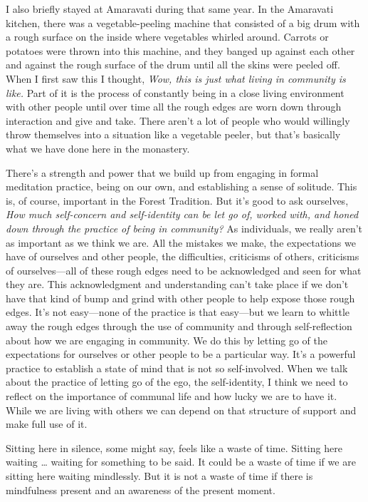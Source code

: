 I also briefly stayed at Amaravati during that same year. In the 
Amaravati kitchen, there was a vegetable-peeling machine that consisted 
of a big drum with a rough surface on the inside where vegetables 
whirled around. Carrots or potatoes were thrown into this machine, and 
they banged up against each other and against the rough surface of the 
drum until all the skins were peeled off. When I first saw this I 
thought, \emph{Wow, this is just what living in community is like.} 
Part of it is the process of constantly being in a close living 
environment with other people until over time all the rough edges are 
worn down through interaction and give and take. There aren't a lot of 
people who would willingly throw themselves into a situation like a 
vegetable peeler, but that's basically what we have done here in the 
monastery.

There's a strength and power that we build up from engaging in formal 
meditation practice, being on our own, and establishing a sense of 
solitude. This is, of course, important in the Forest Tradition. But 
it's good to ask ourselves, \emph{How much self-concern and 
self-identity can be let go of, worked with, and honed down through the 
practice of being in community?} As individuals, we really aren't as 
important as we think we are. All the mistakes we make, the 
expectations we have of ourselves and other people, the difficulties, 
criticisms of others, criticisms of ourselves---all of these rough 
edges need to be acknowledged and seen for what they are. This 
acknowledgment and understanding can't take place if we don't have that 
kind of bump and grind with other people to help expose those rough 
edges. It's not easy---none of the practice is that easy---but we learn 
to whittle away the rough edges through the use of community and 
through self-reflection about how we are engaging in community. We do 
this by letting go of the expectations for ourselves or other people to 
be a particular way. It's a powerful practice to establish a state of 
mind that is not so self-involved. When we talk about the practice of 
letting go of the ego, the self-identity, I think we need to reflect on 
the importance of communal life and how lucky we are to have it. While 
we are living with others we can depend on that structure of support 
and make full use of it.


Sitting here in silence, some might say, feels like a waste of time. 
Sitting here waiting \ldots{} waiting for something to be said. It 
could be a waste of time if we are sitting here waiting mindlessly. But 
it is not a waste of time if there is mindfulness present and an 
awareness of the present moment.

